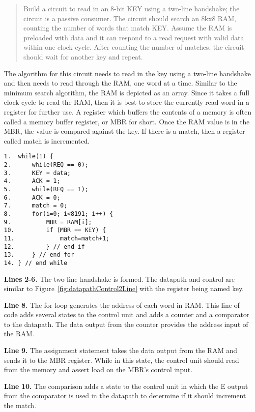 \begin{quote}
    Build a circuit to read in an 8-bit KEY using a
    two-line handshake; the circuit is a passive consumer.
    The circuit should search an 8kx8 RAM, counting the number
    of words that match KEY.  Assume the RAM is
    preloaded with data and it can respond to a read
    request with valid data within one clock cycle.  After
    counting the number of matches, the circuit should wait
    for another key and repeat.
\end{quote}

The algorithm for this circuit needs to read in the key using
a two-line handshake and then needs to read through the RAM, one word
at a time.  Similar to the minimum search algorithm, the
RAM is depicted as an array.  Since it takes a full
clock cycle to read the
RAM, then it is best to store the currently read word in a
register for further use.  A register which buffers the contents
of a memory is often called a memory buffer register, or MBR
for short.  Once the RAM value is in the MBR, the value is compared
against the key.  If there is a match, then a register called
match is incremented.

\begin{verbatim}
1.  while(1) {
2.      while(REQ == 0);
3.      KEY = data;
4.      ACK = 1;
5.      while(REQ == 1);
6.      ACK = 0;
7.      match = 0;
8.      for(i=0; i<8191; i++) {
9.          MBR = RAM[i];
10.         if (MBR == KEY) {
11.             match=match+1;
12.         } // end if
13.     } // end for
14. } // end while
\end{verbatim}

\textbf{ Lines 2-6.} The two-line handshake is formed.  The datapath and control
are similar to Figure~\ref{fig:datapathControl2Line} with the register being
named key.

\textbf{ Line 8.} The for loop generates the address of each word in RAM.
This line of code adds several states to the control unit and adds
a counter and a comparator to the datapath.  The data output from
the counter provides the address input of the RAM.

\textbf{ Line 9.} The assignment statement takes the data output from the
RAM and sends it to the MBR register.  While in this state, the
control unit should read from the memory and assert load on the
MBR's control input.

\textbf{ Line 10.}  The comparison adds a state to the control unit
in which the E output from the comparator is used in the
datapath to determine if it should increment the match.

